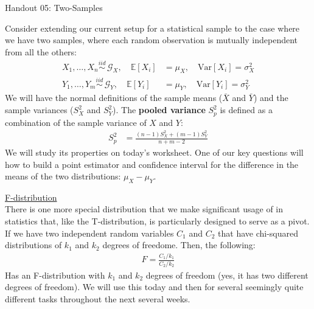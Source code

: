 \documentclass{tufte-handout}
\newcommand{\E}{\mathbb{E}}
\newcommand{\V}{\text{Var}}
\newcommand{\iid}{\stackrel{iid}{\sim}}
\begin{document}
\justify

{\LARGE Handout 05: Two-Samples}

\vspace*{18pt}

\noindent
Consider extending our current setup for a statistical sample to the
case where we have two samples, where each random observation is 
mutually independent from all the others:
\begin{align*}
X_1, \ldots, X_n \iid \, \mathcal{G}_X, \quad \E[X_i] &= \mu_X, \quad \V[X_i] = \sigma_X^2 \\
Y_1, \ldots, Y_m \iid \, \mathcal{G}_Y, \quad \E[Y_i] &= \mu_Y, \quad \V[Y_i] = \sigma_Y^2
\end{align*}
We will have the normal definitions of the sample means ($\bar{X}$ and
$\bar{Y}$) and the sample variances ($S_X^2$ and $S_Y^2$). The
\textbf{pooled variance} $S_p^2$ is defined as a combination
of the sample variance of $X$ and $Y$:
\begin{align*}
S_p^2 &= \frac{(n-1) S_X^2 + (m - 1) S_Y^2}{n + m - 2}
\end{align*}
We will study its properties on today's worksheet. One of our key 
questions will how to build a point estimator and confidence interval
for the difference in the means of the two distributions:
$\mu_X - \mu_Y$.

\vspace*{20pt}

\noindent
\underline{F-distribution} \\
There is one more special distribution that we make significant usage of
in statistics that, like the T-distribution, is particularly designed to
serve as a pivot. If we have two independent random variables $C_1$ and
$C_2$ that have chi-squared distributions of $k_1$ and $k_2$ degrees of
freedome. Then, the following:
\begin{align*}
F = \frac{C_1 / k_1}{C_2 / k_2}
\end{align*}
Has an F-distribution with $k_1$ and $k_2$ degrees of freedom (yes, it 
has two different degrees of freedom). We will use this today and then
for several seemingly quite different tasks throughout the next several
weeks.
\end{document}
